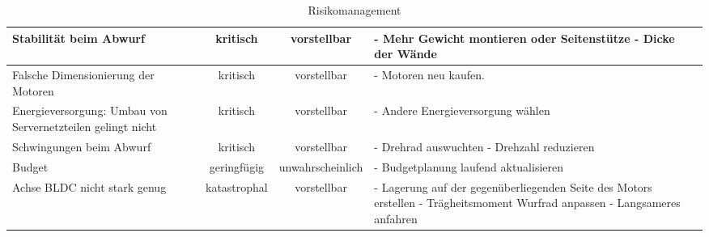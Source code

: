 \begin{landscape}
\begin{table}
\begin{tabular}{|p{5cm}|c|c|p{9cm}|}
			\hline \rowcolor{yellow} \hline Stabilität beim Abwurf & kritisch & vorstellbar &
			- Mehr Gewicht montieren oder Seitenstütze \newline
			- Dicke der Wände \\ 
			
			\hline \rowcolor{yellow} \hline Falsche Dimensionierung der Motoren & kritisch & vorstellbar &
			- Motoren neu kaufen. \\
			\hline \rowcolor{yellow} \hline Energieversorgung: Umbau von Servernetzteilen gelingt nicht & kritisch & vorstellbar &
			- Andere Energieversorgung wählen \\ 
			
			\hline \rowcolor{yellow} \hline Schwingungen beim Abwurf & kritisch & vorstellbar &
			- Drehrad auswuchten \newline
			- Drehzahl reduzieren \\
			
			\hline \rowcolor{green} \hline Budget & geringfügig & unwahrscheinlich &
			- Budgetplanung laufend aktualisieren  \\ 
			
			\hline \rowcolor{yellow} \hline Achse BLDC nicht stark genug & katastrophal & vorstellbar &
			- Lagerung auf der gegenüberliegenden Seite des Motors erstellen \newline
			- Trägheitsmoment Wurfrad anpassen \newline
			- Langsameres anfahren \\
			
			 
		\end{tabular}
		\caption{Risikomanagement}
		\label{tab:risikomanagement}
	\end{table} 
\end{landscape}
